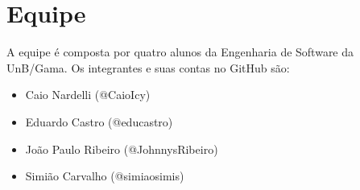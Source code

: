 \chapter[Equipe]{Equipe}

A equipe é composta por quatro alunos da Engenharia de Software da UnB/Gama. Os integrantes e suas contas no GitHub são:

\begin{itemize}
\item Caio Nardelli (@CaioIcy)
\item Eduardo Castro (@educastro)
\item João Paulo Ribeiro (@JohnnysRibeiro)
\item Simião Carvalho (@simiaosimis)
\end{itemize}
